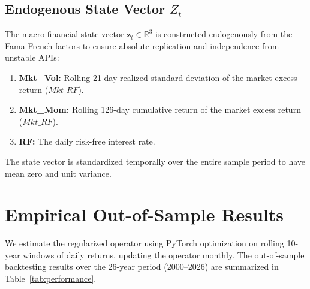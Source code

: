 \documentclass[12pt]{article}
\begin{document}
\subsection{Endogenous State Vector $Z_t$}
The macro-financial state vector $\mathbf{z}_t \in \mathbb{R}^3$ is constructed endogenously from the Fama-French factors to ensure absolute replication and independence from unstable APIs:
\begin{enumerate}
    \item \textbf{Mkt\_Vol:} Rolling 21-day realized standard deviation of the market excess return ($Mkt\_RF$).
    \item \textbf{Mkt\_Mom:} Rolling 126-day cumulative return of the market excess return ($Mkt\_RF$).
    \item \textbf{RF:} The daily risk-free interest rate.
\end{enumerate}
The state vector is standardized temporally over the entire sample period to have mean zero and unit variance.

\section{Empirical Out-of-Sample Results}

We estimate the regularized operator using PyTorch optimization on rolling 10-year windows of daily returns, updating the operator monthly. The out-of-sample backtesting results over the 26-year period (2000--2026) are summarized in Table~\ref{tab:performance}.

\begin{table}[htbp]
\centering
\caption{\textbf{Out-of-Sample Performance Summary (2000--2026)}}
\label{tab:performance}
\end{table}
\end{document}
